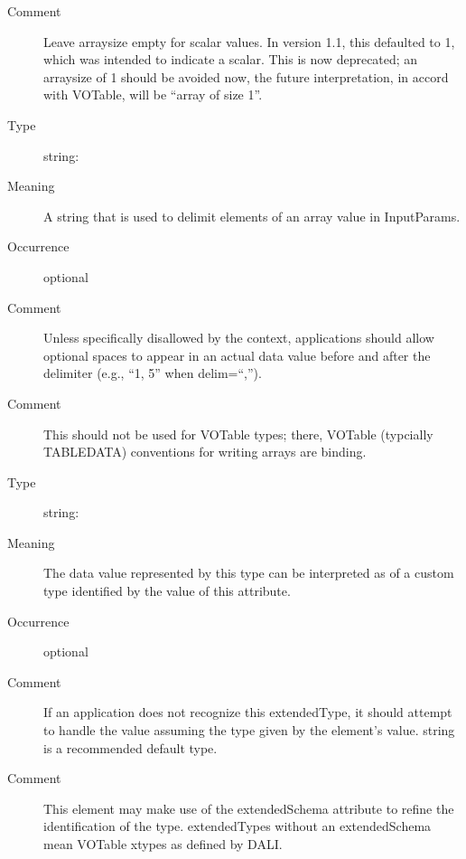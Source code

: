 \documentclass[11pt,a4paper]{ivoa}
\begin{document}
\begin{generated}
\begin{bigdescription}
\begin{description}
\item[Comment] Leave arraysize empty for scalar values.  In version 1.1,
                     this defaulted to 1, which was intended to indicate
                     a scalar.  This is now deprecated; an arraysize of 1 should
                     be avoided now, the future interpretation, in accord with
                     VOTable, will be “array of size 1”.
\end{description}
\item[delim]
\begin{description}
\item[Type] string: 
\item[Meaning] A string that is used to delimit elements of an array
                     value in InputParams.
\item[Occurrence] optional
\item[Comment] Unless specifically disallowed by the context,
                     applications should allow optional spaces to
                     appear in an actual data value before and after
                     the delimiter (e.g., “1, 5” when delim=“,”).
\item[Comment] This should not be used for VOTable types; there,
                     VOTable (typcially TABLEDATA) conventions for writing
                     arrays are binding.
\end{description}
\item[extendedType]
\begin{description}
\item[Type] string: 
\item[Meaning] The data value represented by this type can be
                     interpreted as of a custom type identified by
                     the value of this attribute.
\item[Occurrence] optional
\item[Comment] If an application does not recognize this
                     extendedType, it should attempt to handle the value
                     assuming the type given by the element's value.
                     string is a recommended default type.
\item[Comment] This element may make use of the extendedSchema
                     attribute to refine the identification of the
                     type.  extendedTypes without an extendedSchema
                     mean VOTable xtypes as defined by DALI.
\end{description}
\item[extendedSchema]

\end{bigdescription}
\end{generated}
\end{document}
